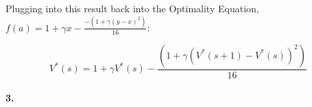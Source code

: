 \documentclass[12pt]{article}
\begin{document}
Plugging into this result back into the Optimality Equation, $f(a) = 1 + \gamma x - \frac{-(1 + \gamma (y - x)^2)}{16}$:

$$V^{*}(s) = 1 + \gamma V^{*}(s) - \frac{(1 + \gamma (V^{*}(s+1) - V^{*}(s))^2)}{16}$$

\paragraph{3. }

\end{document}
